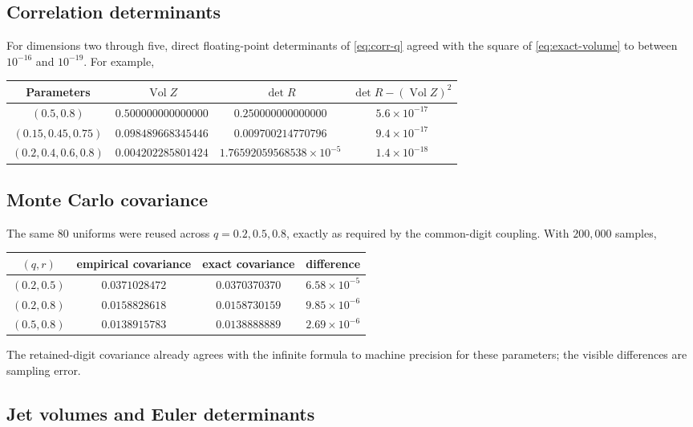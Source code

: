 \documentclass[11pt,a4paper]{article}
\theoremstyle{definition}
\theoremstyle{remark}
\newcommand{\Vol}{\operatorname{Vol}}
\begin{document}
\subsection{Correlation determinants}

For dimensions two through five, direct floating-point determinants of \eqref{eq:corr-q} agreed with the square of \eqref{eq:exact-volume} to between $10^{-16}$ and $10^{-19}$.  For example,
\begin{center}
\begin{tabular}{c c c c}
\toprule
Parameters & $\Vol Z$ & $\det R$ & $\det R-(\Vol Z)^2$\\
\midrule
$(0.5,0.8)$&$0.500000000000000$&$0.250000000000000$&$5.6\times10^{-17}$\\
$(0.15,0.45,0.75)$&$0.098489668345446$&$0.009700214770796$&$9.4\times10^{-17}$\\
$(0.2,0.4,0.6,0.8)$&$0.004202285801424$&$1.76592059568538\times10^{-5}$&$1.4\times10^{-18}$\\
\bottomrule
\end{tabular}
\end{center}

\subsection{Monte Carlo covariance}

The same $80$ uniforms were reused across $q=0.2,0.5,0.8$, exactly as required by the common-digit coupling.  With $200{,}000$ samples,
\begin{center}
\begin{tabular}{c c c c}
\toprule
$(q,r)$ & empirical covariance & exact covariance & difference\\
\midrule
$(0.2,0.5)$&$0.0371028472$&$0.0370370370$&$6.58\times10^{-5}$\\
$(0.2,0.8)$&$0.0158828618$&$0.0158730159$&$9.85\times10^{-6}$\\
$(0.5,0.8)$&$0.0138915783$&$0.0138888889$&$2.69\times10^{-6}$\\
\bottomrule
\end{tabular}
\end{center}
The retained-digit covariance already agrees with the infinite formula to machine precision for these parameters; the visible differences are sampling error.

\subsection{Jet volumes and Euler determinants}
\end{document}
